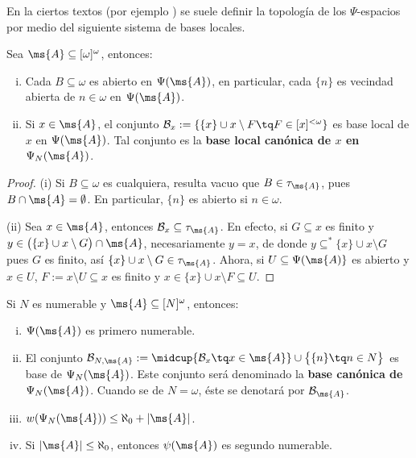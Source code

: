 	En la ciertos textos (por ejemplo \cite{hruMrowka}) se suele definir la topología de los $\Psi$-espacios por medio del siguiente sistema de bases locales.

	\begin{proposicion}\label{prop-BaseLocMrowka}
		Sea $\ms{A} \subseteq [\omega]^\omega$, entonces:
		\begin{enumerate}[i)]
			\item Cada $B \subseteq \omega$ es abierto en $\Psi(\ms{A})$, en particular, cada $\{n\}$ es vecindad abierta de $n \in \omega$ en $\Psi(\ms{A})$.
			\item Si $x \in \ms{A}$, el conjunto $\mathcal{B}_x:=\{ \{x\} \cup x \setminus F \tq F \in[x]^{<\omega} \}$ es base local de $x$ en $\Psi(\ms{A})$. Tal conjunto es la \textbf{base local canónica de $x$ en $\Psi_N(\ms{A})$}.  
		\end{enumerate}
	\end{proposicion}
	\begin{proof} 
		(i) Si $B \subseteq \omega$ es cualquiera, resulta vacuo que $B \in \tau_\ms{A}$, pues $B \cap \ms{A} = \emptyset$. En particular, $\{n\}$ es abierto si $n \in \omega$.
	
		(ii) Sea $x \in \ms{A}$, entonces $\mathcal{B}_x \subseteq \tau_\ms{A}$. En efecto, si $G \subseteq x$ es finito y $y \in \big( \{x\} \cup x \setminus G \big) \cap \ms{A}$, necesariamente $y=x$, de donde $y \subseteq^* \{x\} \cup x \setminus G$ pues $G$ es finito, así $\{x\} \cup x \setminus G \in \tau_{\ms{A}}$. Ahora, si $U \subseteq \Psi(\ms{A)}$ es abierto y $x \in U$, $F:= x \setminus U \subseteq x$ es finito y $x \in \{x\} \cup x \setminus F \subseteq U$.
	\end{proof} 
		
	\begin{corolario}\label{cor-NumAxMrowka}
		Si $N$ es numerable y $\ms{A} \subseteq [N]^\omega$, entonces:
		\begin{enumerate}[i)]
			\item $\Psi(\ms{A})$ es primero numerable.
			\item El conjunto $\mathcal{B}_{N,\ms{A}} := \midcup \{ \mathcal{B}_x \tq x \in \ms{A} \} \cup \big\{ \{n\} \tq n \in N \big\}$ es base de $\Psi_N(\ms{A})$. Este conjunto será denominado la \textbf{base canónica de $\Psi_N(\ms{A})$}. Cuando se de $N=\omega$, éste se denotará por $\mathcal{B}_\ms{A}$.
			\item $w(\Psi_N(\ms{A})) \leq \aleph_0+|\ms{A}|$.
			\item Si $|\ms{A}|\leq \aleph_0$, entonces $\psi(\ms{A})$ es segundo numerable.
		\end{enumerate}
	\end{corolario}
	

